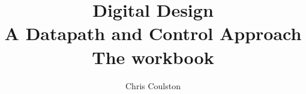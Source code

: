\documentclass[11pt,psfig]{article}
\begin{document}
\newcommand{\bs}{\backslash}
\newcommand{\SOPmin}{${\rm SOP}_{\rm min} \ $}
\newcommand{\POSmin}{${\rm POS}_{\rm min} \ $}
\newcommand{\Tplh}{${\rm T}_{\rm plh} \ $}
\newcommand{\Tphl}{${\rm T}_{\rm phl} \ $}
\newcommand{\VCC}{${\rm V}_{\rm CC} \ $}
\newcommand{\VIH}{${\rm V}_{\rm IH} \ $}
\newcommand{\VIL}{${\rm V}_{\rm IL} \ $}
\newcommand{\IOH}{${\rm I}_{\rm OH} \ $}
\newcommand{\IOL}{${\rm I}_{\rm OL} \ $}
\newcommand{\TA}{${\rm T}_{\rm A} \ $}
\newcommand{\VOH}{${\rm V}_{\rm OH} \ $}
\newcommand{\VOL}{${\rm V}_{\rm OL} \ $}
\newcommand{\IIH}{${\rm I}_{\rm IH} \ $}
\newcommand{\IIL}{${\rm I}_{\rm IL} \ $}
\newcommand{\Ra}{${\rm R}_{\rm a} \ $}
\newcommand{\Rb}{${\rm R}_{\rm b} \ $}
\newcommand{\mod}{{\rm mod} \ }


\title{{\Huge Digital Design} \\
A Datapath and Control Approach \\
The workbook}
\author{Chris Coulston}
\date{}
\maketitle












\end{document}
